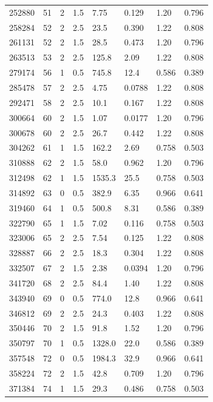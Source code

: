 \documentclass[preview]{standalone}
\begin{document}
{{{\begin{tabular}{L{1.2cm}C{1.2cm} C{0.3cm}C{0.5cm} C{1.4cm}C{1.4cm} C{1.4cm}C{1.4cm}}
  252880  &    51  & 2     & 1.5 &  7.75  & 0.129  & 1.20 &  0.796   \\ 
  258284  &    52  & 2     & 2.5 &  23.5  & 0.390  & 1.22 &  0.808   \\ 
  261131  &    52  & 2     & 1.5 &  28.5  & 0.473  & 1.20 &  0.796   \\ 
  263513  &    53  & 2     & 2.5 &  125.8  & 2.09  & 1.22 &  0.808   \\ 
  279174  &    56  & 1     & 0.5 &  745.8  & 12.4  & 0.586 &  0.389   \\ 
  285478  &    57  & 2     & 2.5 &  4.75  & 0.0788  & 1.22 &  0.808   \\ 
  292471  &    58  & 2     & 2.5 &  10.1  & 0.167  & 1.22 &  0.808   \\ 
  300664  &    60  & 2     & 1.5 &  1.07  & 0.0177  & 1.20 &  0.796   \\ 
  300678  &    60  & 2     & 2.5 &  26.7  & 0.442  & 1.22 &  0.808   \\ 
  304262  &    61  & 1     & 1.5 &  162.2  & 2.69  & 0.758 &  0.503   \\ 
  310888  &    62  & 2     & 1.5 &  58.0  & 0.962  & 1.20 &  0.796   \\ 
  312498  &    62  & 1     & 1.5 &  1535.3  & 25.5  & 0.758 &  0.503   \\ 
  314892  &    63  & 0     & 0.5 &  382.9  & 6.35  & 0.966 &  0.641   \\ 
  319460  &    64  & 1     & 0.5 &  500.8  & 8.31  & 0.586 &  0.389   \\ 
  322790  &    65  & 1     & 1.5 &  7.02  & 0.116  & 0.758 &  0.503   \\ 
  323006  &    65  & 2     & 2.5 &  7.54  & 0.125  & 1.22 &  0.808   \\ 
  328887  &    66  & 2     & 2.5 &  18.3  & 0.304  & 1.22 &  0.808   \\ 
  332507  &    67  & 2     & 1.5 &  2.38  & 0.0394  & 1.20 &  0.796   \\ 
  341720  &    68  & 2     & 2.5 &  84.4  & 1.40  & 1.22 &  0.808   \\ 
  343940  &    69  & 0     & 0.5 &  774.0  & 12.8  & 0.966 &  0.641   \\ 
  346812  &    69  & 2     & 2.5 &  24.3  & 0.403  & 1.22 &  0.808   \\ 
  350446  &    70  & 2     & 1.5 &  91.8  & 1.52  & 1.20 &  0.796   \\ 
  350797  &    70  & 1     & 0.5 &  1328.0  & 22.0  & 0.586 &  0.389   \\ 
  357548  &    72  & 0     & 0.5 &  1984.3  & 32.9  & 0.966 &  0.641   \\ 
  358224  &    72  & 2     & 1.5 &  42.8  & 0.709  & 1.20 &  0.796   \\ 
  371384  &    74  & 1     & 1.5 &  29.3  & 0.486  & 0.758 &  0.503   \\ 
\hline 
\end{tabular} 

}}}
\end{document}
